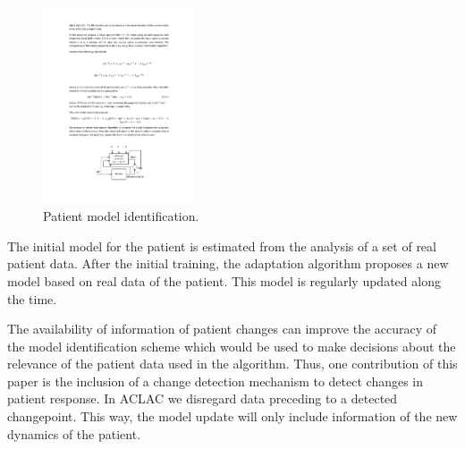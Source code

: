 \begin{figure}[htb!]
\centering
\includegraphics[width=0.4\textwidth]{./pics/aclac_paper/ARXmodel.pdf}
\caption{Patient model identification.} %
\label{fig:ARXmodel}
\end{figure}

The initial model for the patient is estimated from the analysis of a set of real patient data.
%
After the initial training, the adaptation algorithm proposes a new
model based on real data of the patient. This model is regularly
updated along the time.

The availability of information of patient changes can improve the
accuracy of the model identification scheme which would be used to
make decisions about the relevance of the patient data used in the algorithm.
Thus, one contribution of this paper is the inclusion of a change
detection mechanism to detect changes in patient response.
%
In ACLAC we disregard data preceding to a detected changepoint.
This way, the model update will only include information of the new dynamics of the patient.

